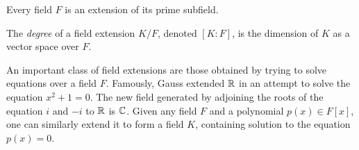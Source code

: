 \begin{remark}
  Every field $F$ is an extension of its prime subfield.
\end{remark}

\begin{definition}
  The \textit{degree} of a field extension $K/F$, denoted $[K:F]$, is the dimension of $K$ as a
  vector space over $F$.
\end{definition}

An important class of field extensions are those obtained by trying to solve equations over
a field $F$. Famously, Gauss extended $\mathbb{R}$ in an attempt to solve the equation $x^2+1=0$.
The new field generated by adjoining the roots of the equation $i$ and $-i$ to $\mathbb{R}$ is $\mathbb{C}$.
Given any field $F$ and a polynomial $p(x)\in F[x]$, one can similarly extend it to form a field
$K$, containing solution to the equation $p(x)=0$.
